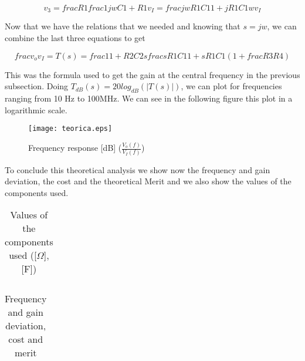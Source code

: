 \begin{equation}
	v_3 = frac{R1}{frac{1}{jwC1 + R1}}v_I = frac{jwR1C1}{1 + jR1C1w}v_I
\end{equation}

\par Now that we have the relations that we needed and knowing that $s=jw$, we can combine the last three equations to get

\begin{equation}
	frac{v_o}{v_I} = T(s) = frac{1}{1 + R2 C2 s} frac{s R1 C1}{1 + s R1 C1} (1 + frac{R3}{R4})
\end{equation}

\par This was the formula used to get the gain at the central frequency in the previous subsection. Doing $T_{dB}(s) = 20log_{dB}(|T(s)|)$, we can plot for frequencies ranging from 10 Hz to 100MHz. We can see in the following figure this plot in a logarithmic scale.

\begin{figure}[H] 
	\centering
	\texttt{[image: teorica.eps]}
	\caption{Frequency response [dB] ($\frac{V_o(f)}{V_I(f)}$)}
\end{figure}

\par To conclude this theoretical analysis we show now the frequency and gain deviation, the cost and the theoretical Merit and we also show the values of the components used.

\vspace{5mm}
\begin{table}[H]
	\centering
	\begin{tabularx}{0.9\textwidth} {
 	    | >{\raggedright\arraybackslash}X
  	    | >{\raggedleft\arraybackslash}X | }
	\hline
	
	\end{tabularx}
	\caption{Values of the components used ([$\Omega$],[F])}
	\label{tab:currents}
\end{table}
\vspace{5mm}

\vspace{5mm}
\begin{table}[H]
	\centering
	\begin{tabularx}{0.9\textwidth} {
 	    | >{\raggedright\arraybackslash}X
  	    | >{\raggedleft\arraybackslash}X | }
	\hline
	
	\end{tabularx}
	\caption{Frequency and gain deviation, cost and merit}
	\label{tab:currents}
\end{table}
\vspace{5mm}

